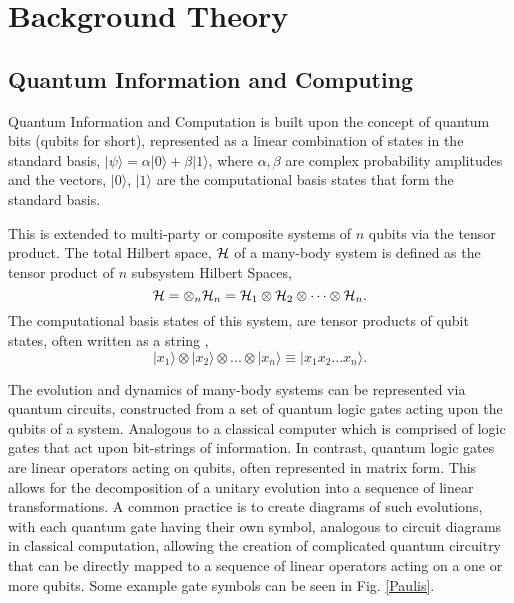 \section{Background Theory}
\subsection{Quantum Information and Computing}
\vspace{-0.15in}
Quantum Information and Computation is built upon the concept of quantum bits (qubits for short), represented as a linear
combination of states in the standard basis,
$|\psi\rangle = \alpha |0\rangle + \beta |1\rangle$, where $\alpha, \beta$ are complex probability amplitudes
and the vectors, $|0\rangle$, $|1\rangle$ are the computational basis states that form the standard basis.

This is extended to multi-party or composite systems of $n$ qubits via the tensor product. The total Hilbert space, $\cal{H}$ of
a many-body system is defined as the tensor product of $n$ subsystem Hilbert Spaces,
\begin{equation}
    {\cal{H}} = \otimes_n {\cal{H}}_n = {\cal{H}}_{1} \otimes {\cal{H}}_{2} \otimes \dots \otimes {\cal{H}}_n.
\end{equation}
The computational basis states of this system, are tensor products of qubit states, often written as a string \cite{schumacher_westmoreland_2010},
\[|x_1\rangle \otimes |x_2\rangle \otimes ... \otimes |x_n\rangle \equiv |x_1 x_2... x_n \rangle. \]

The evolution and dynamics of many-body systems can be represented via quantum circuits, constructed from a set of quantum logic gates acting
upon the qubits of a system. Analogous to a classical computer which is comprised of logic gates that act upon
bit-strings of information. In contrast, quantum logic gates are linear operators acting
on qubits, often represented in matrix form. This allows for the decomposition of a unitary evolution into a
sequence of linear transformations. A common practice is to create
diagrams of such evolutions, with each quantum gate having their own symbol, analogous to circuit diagrams in classical
computation, allowing the creation of complicated quantum circuitry that can be directly mapped to a sequence of linear
operators acting on a one or more qubits. Some example gate symbols can be seen in Fig. \ref{Paulis}.




